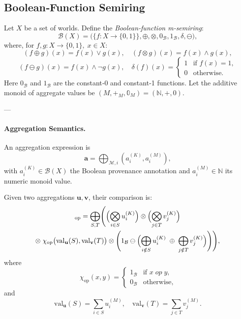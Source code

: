 \subsection{Boolean‐Function Semiring}

Let \(X\) be a set of worlds.  
Define the \emph{Boolean‐function m‐semiring}:
\[
  \mathcal{B}(X)
  = \bigl(\{f : X \to \{0,1\}\},\oplus,\otimes,0_{\mathcal{B}},1_{\mathcal{B}},\delta,\ominus\bigr),
\]
where, for \(f,g : X\to\{0,1\},\;x\in X\):
\[
  (f\oplus g)(x)=f(x)\vee g(x), \quad (f\otimes g)(x)=f(x)\wedge g(x),
\]
\[
  (f\ominus g)(x)=f(x)\wedge\neg g(x),\quad \delta(f)(x)=
  \begin{cases}
  1 & \text{if } f(x)=1,\\
  0 & \text{otherwise.}
  \end{cases}
\]
Here \(0_{\mathcal{B}}\) and \(1_{\mathcal{B}}\) are the constant‐0 and constant‐1 functions.  
Let the additive monoid of aggregate values be \((M,+_M,\mathbb{0}_M)=(\mathbb{N},+,0)\).

---

\paragraph{Aggregation Semantics.}  
An aggregation expression is
\[
\mathbf{a}=\bigoplus_{\mathcal{M},i}(a_i^{(K)},a_i^{(M)}),
\]
with \(a_i^{(K)}\in\mathcal{B}(X)\) the Boolean provenance annotation and \(a_i^{(M)}\in\mathbb{N}\) its numeric monoid value.  

Given two aggregations \(\mathbf{u},\mathbf{v}\), their comparison is:
\begin{multline}
[\mathbf{u}\oslash \mathbf{v}]_{\mathrm{op}}=
\bigoplus_{S,T}
\Biggl(
\Bigl(\bigotimes_{i\in S}u_i^{(K)}\Bigr)
\otimes
\Bigl(\bigotimes_{j\in T}v_j^{(K)}\Bigr) \\
\otimes\;\chi_{\mathrm{op}}\bigl(\mathrm{val}_\mathbf{u}(S),\mathrm{val}_\mathbf{v}(T)\bigr)
\otimes
\Biggl(1_{\mathcal{B}}\ominus\Bigl(\bigoplus_{i\notin S}u_i^{(K)}\;\oplus\;\bigoplus_{j\notin T}v_j^{(K)}\Bigr)\Biggr)
\Biggr),
\end{multline}
where
\[
\chi_{\mathrm{op}}(x,y)=
\begin{cases}
1_{\mathcal{B}} & \text{if } x\;\mathit{op}\; y, \\
0_{\mathcal{B}} & \text{otherwise,}
\end{cases}
\]
and
\[
\mathrm{val}_\mathbf{u}(S)=\sum_{i\in S}u_i^{(M)},\quad
\mathrm{val}_\mathbf{v}(T)=\sum_{j\in T}v_j^{(M)}.
\]

